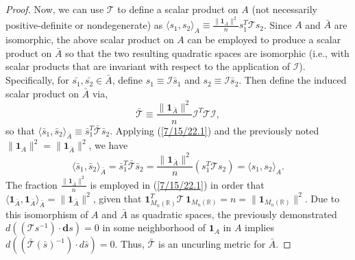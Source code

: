 \documentclass{amsart}
\numberwithin{equation}{section}
\theoremstyle{definition}
\numberwithin{theorem}{section}
\begin{document}
\begin{proof}
   Now, we can use $\mathcal{\mathcal{T}}$ to define a scalar product on $A$ (not necessarily positive-definite or nondegenerate) as $\langle s_1,s_2\rangle_A \equiv  \frac{\|\mathbf{1}_{A}\|^2}{n}s_1^T \mathcal{\mathcal{T}} s_2$. 
    Since $A$ and $\bar{A}$ are isomorphic, the above scalar product on $A$ can be employed to produce a scalar product on $\bar{A}$ so that the two resulting quadratic spaces are isomorphic (i.e., with scalar products that are invariant with respect to the application of $\mathcal{I}$).  Specifically, for $\bar{s_1},\bar{s_2}\in\bar{A}$, define $s_1 \equiv \mathcal{I}\bar{s}_1$ and $s_2 \equiv \mathcal{I}\bar{s}_2$.  Then define the induced scalar product on $\bar{A}$ via, \begin{equation}\label{7/15/22.1} \bar{\mathcal{\mathcal{T}}} \equiv  \frac{\|\mathbf{1}_{\bar{A}}\|^2}{n}\mathcal{I}^T\mathcal{\mathcal{T}}\mathcal{I},\end{equation} so that $\langle \bar{s}_1,\bar{s}_2\rangle_{\bar{A}} \equiv \bar{s}_1^T \bar{\mathcal{\mathcal{T}}} \bar{s}_2$.  Applying (\ref{7/15/22.1}) and the previously noted $\|\mathbf{1}_A\|^2 = \|\mathbf{1}_{\bar{A}}\|^2$, we have \begin{equation}\label{8/25/22.1} \langle \bar{s}_1,\bar{s}_2\rangle_{\bar{A}} = \bar{s}_1^T \bar{\mathcal{T}} \bar{s}_2 = \frac{\|\mathbf{1}_{\bar{A}}\|^2}{n}( s_1^T \mathcal{T} s_2) = \langle s_1,s_2\rangle_{A}.\end{equation}  The fraction $\frac{\|\mathbf{1}_{\bar{A}}\|^2}{n}$ is employed in (\ref{7/15/22.1}) in order that $\langle \mathbf{1}_{\bar{A}},\mathbf{1}_{\bar{A}}\rangle_{\bar{A}} = \|\mathbf{1}_{\bar{A}}\|^2$, given that $\mathbf{1}_{M_n(\mathbb{R})}^T \mathcal{T}\,\mathbf{1}_{M_n(\mathbb{R})} = n = \|\mathbf{1}_{M_n(\mathbb{R})}\|^2$. Due to this isomorphism of $A$ and $\bar{A}$ as quadratic spaces, the previously demonstrated $d((\mathcal{T}s^{-1})\cdot \mathbf{d}s) = 0$ in some neighborhood of $\mathbf{1}_A$ in $A$ implies 
\mbox{$d((\bar{\mathcal{T}}(\bar{s})^{-1})\cdot d\bar{s}) = 0$.} Thus, $\bar{\mathcal{T}}$ is an uncurling metric for $\bar{A}$.



\end{proof}
\end{document}
